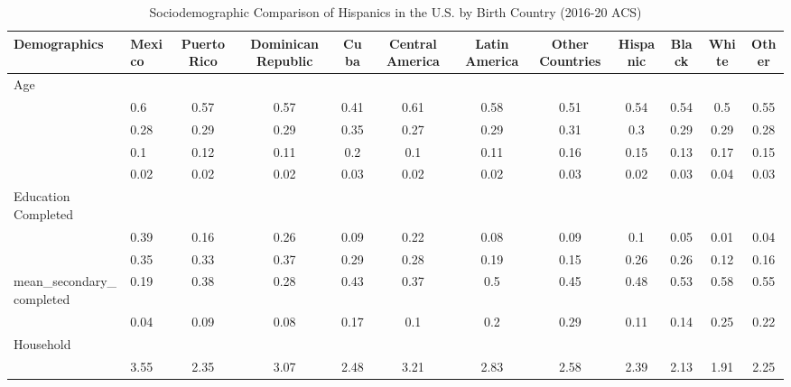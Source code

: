 \begin{table}[ht]
\centering
\caption{Sociodemographic Comparison of Hispanics in the U.S. by Birth Country (2016-20 ACS)} 
\begingroup\small
\begin{tabular}{>{\raggedright\arraybackslash}p{3.2cm}|lcccccc|cccc}
  \hline
Demographics & Mexico & Puerto Rico & Dominican Republic & Cuba & Central America & Latin America & Other Countries & Hispanic & Black & White & Other \\ 
  \hline
Age &  &  &  &  &  &  &  &  &  &  &  \\ 
  \multicolumn{1}{>{\raggedleft\arraybackslash}p{1.5cm}|}{\makebox[1.5cm][r]{60 - 69 }}& 0.6 & 0.57 & 0.57 & 0.41 & 0.61 & 0.58 & 0.51 & 0.54 & 0.54 & 0.5 & 0.55 \\ 
  \multicolumn{1}{>{\raggedleft\arraybackslash}p{1.5cm}|}{\makebox[1.5cm][r]{70 - 79 }}& 0.28 & 0.29 & 0.29 & 0.35 & 0.27 & 0.29 & 0.31 & 0.3 & 0.29 & 0.29 & 0.28 \\ 
  \multicolumn{1}{>{\raggedleft\arraybackslash}p{1.5cm}|}{\makebox[1.5cm][r]{80 - 89 }}& 0.1 & 0.12 & 0.11 & 0.2 & 0.1 & 0.11 & 0.16 & 0.15 & 0.13 & 0.17 & 0.15 \\ 
  \multicolumn{1}{>{\raggedleft\arraybackslash}p{1.5cm}|}{\makebox[1.5cm][r]{90 plus }}& 0.02 & 0.02 & 0.02 & 0.03 & 0.02 & 0.02 & 0.03 & 0.02 & 0.03 & 0.04 & 0.03 \\ 
  Education Completed &  &  &  &  &  &  &  &  &  &  &  \\ 
  \multicolumn{1}{>{\raggedleft\arraybackslash}p{3.2cm}|}{\makebox[3.2cm][r]{Less than Primary }}& 0.39 & 0.16 & 0.26 & 0.09 & 0.22 & 0.08 & 0.09 & 0.1 & 0.05 & 0.01 & 0.04 \\ 
  \multicolumn{1}{>{\raggedleft\arraybackslash}p{1.7cm}|}{\makebox[1.7cm][r]{Primary }}& 0.35 & 0.33 & 0.37 & 0.29 & 0.28 & 0.19 & 0.15 & 0.26 & 0.26 & 0.12 & 0.16 \\ 
  mean\_secondary\_completed & 0.19 & 0.38 & 0.28 & 0.43 & 0.37 & 0.5 & 0.45 & 0.48 & 0.53 & 0.58 & 0.55 \\ 
  \multicolumn{1}{>{\raggedleft\arraybackslash}p{2cm}|}{\makebox[2cm][r]{University }}& 0.04 & 0.09 & 0.08 & 0.17 & 0.1 & 0.2 & 0.29 & 0.11 & 0.14 & 0.25 & 0.22 \\ 
  Household &  &  &  &  &  &  &  &  &  &  &  \\ 
  \multicolumn{1}{>{\raggedleft\arraybackslash}p{2.7cm}|}{\makebox[2.7cm][r]{Household Size }}& 3.55 & 2.35 & 3.07 & 2.48 & 3.21 & 2.83 & 2.58 & 2.39 & 2.13 & 1.91 & 2.25 \\ 

\end{tabular}
\end{table}
